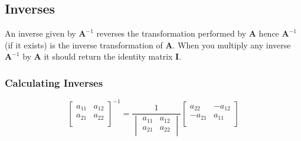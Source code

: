 \documentclass[12pt] {article}
\begin{document}
\subsection*{Inverses}
An inverse given by $\textbf{A}^{-1}$ reverses the transformation performed by \textbf{A}
hence $\textbf{A}^{-1}$ (if it exists) is the inverse transformation of \textbf{A}. When 
you multiply any inverse $\textbf{A}^{-1}$ by \textbf{A} it should return the identity 
matrix \textbf{I}.
\subsubsection*{Calculating Inverses}
\begin{equation*}
  \begin{bmatrix}
    a_{11} & a_{12} \\
    a_{21} & a_{22} \\
  \end{bmatrix}
  ^{-1}
  =
  \frac{1}{
    \begin{vmatrix}
      a_{11} & a_{12} \\
      a_{21} & a_{22} \\
    \end{vmatrix}
  }
  \begin{bmatrix}
      a_{22} & -a_{12} \\
      -a_{21} & a_{11} \\
  \end{bmatrix}
\end{equation*}
\end{document}

